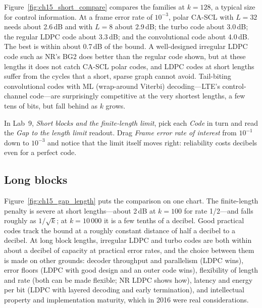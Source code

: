 Figure~\ref{fig:ch15_short_compare} compares the families at $k=128$, a typical size for control
information. At a frame error rate of $10^{-3}$, polar CA-SCL with $L=32$ needs about 2.6\,dB and with
$L=8$ about 2.9\,dB; the turbo code about 3.0\,dB; the regular LDPC code about 3.3\,dB; and the
convolutional code about 4.0\,dB. The best is within about 0.7\,dB of the bound. A well-designed
irregular LDPC code such as NR's BG2 does better than the regular code shown, but at these lengths
it does not catch CA-SCL polar codes, and LDPC codes at short lengths suffer from the cycles that a
short, sparse graph cannot avoid. Tail-biting convolutional codes with ML (wrap-around Viterbi)
decoding---LTE's control-channel code---are surprisingly competitive at the very shortest lengths, a
few tens of bits, but fall behind as $k$ grows.


\begin{tryit}
In Lab~9, \emph{Short blocks and the finite-length limit}, pick each \emph{Code} in turn and read
the \emph{Gap to the length limit} readout. Drag \emph{Frame error rate of interest} from $10^{-1}$
down to $10^{-3}$ and notice that the limit itself moves right: reliability costs decibels even
for a perfect code.
\end{tryit}

\subsection{Long blocks}

Figure~\ref{fig:ch15_gap_length} puts the comparison on one chart. The finite-length penalty is
severe at short lengths---about 2\,dB at $k=100$ for rate 1/2---and falls roughly as $1/\sqrt k$; at
$k=10\,000$ it is a few tenths of a decibel. Good practical codes track the bound at a roughly
constant distance of half a decibel to a decibel. At long block lengths, irregular LDPC and turbo
codes are both within about a decibel of capacity at practical error rates, and the choice between
them is made on other grounds: decoder throughput and parallelism (LDPC wins), error floors (LDPC
with good design and an outer code wins), flexibility of length and rate (both can be made flexible;
NR LDPC shows how), latency and energy per bit (LDPC with layered decoding and early termination),
and intellectual property and implementation maturity, which in 2016 were real considerations.

